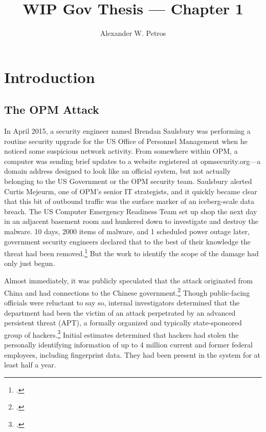 \documentclass[12pt]{article}
\title{WIP Gov Thesis --- Chapter 1}
\author{Alexander W. Petros}
\begin{document}
\section{Introduction}
\subsection{The OPM Attack}
In April 2015, a security engineer named Brendan Saulsbury was performing a routine security upgrade for the US Office of Personnel Management when he noticed some suspicious network activity. From somewhere within OPM, a computer was sending brief updates to a website registered at opmsecurity.org---a domain address designed to look like an official system, but not actually belonging to the US Government or the OPM security team. Saulsbury alerted Curtis Mejeurm, one of OPM's senior IT strategists, and it quickly became clear that this bit of outbound traffic was the surface marker of an iceberg-scale data breach. The US Computer Emergency Readiness Team set up shop the next day in an adjacent basement room and hunkered down to investigate and destroy the malware. 10 days, 2000 items of malware, and 1 scheduled power outage later, government security engineers declared that to the best of their knowledge the threat had been removed.\footcite{koerner_inside_2016} But the work to identify the scope of the damage had only just begun.

Almost immediately, it was publicly speculated that the attack originated from China and had connections to the Chinese government.\footcite{spetalnick_china_2015} Though public-facing officials were reluctant to say so, internal investigators determined that the department had been the victim of an attack perpetrated by an advanced persistent threat (APT), a formally organized and typically state-sponsored group of hackers.\footcite[Attributing a cyberattack is difficult because hackers have endless means to obscure their orgins. In this case, however, the first clue that investigators found was left there on purpose. A particularly effective group of hackers tied to China has made it a calling card of sorts to register sites using the names of members of Marvel's comic book superhero group, The Avengers. In this case, opmsecurity.org was registered under the name "Steve Rogers," better known as Captain America.]{koerner_inside_2016} Initial estimates determined that hackers had stolen the personally identifying information of up to 4 million current and former federal employees, including fingerprint data. They had been present in the system for at least half a year. 
\end{document}
